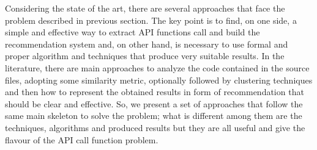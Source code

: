 Considering the state of the art, there are several approaches that face the problem described in previous section. 
The key point is to find, on one side, a simple and effective way to extract API functions call and build the recommendation system and, on other hand, is necessary to use formal and proper algorithm and techniques that produce very suitable results. In the literature, there are main approaches  to analyze the code contained in the source files, adopting some similarity metric, optionally followed by clustering techniques and then how to represent the obtained results in form of recommendation that should be clear and effective. So, we present a set of approaches that follow the same main skeleton to solve the problem; what is different among them are the techniques, algorithms and produced results but they are all useful and give the flavour of the API call function problem. 



